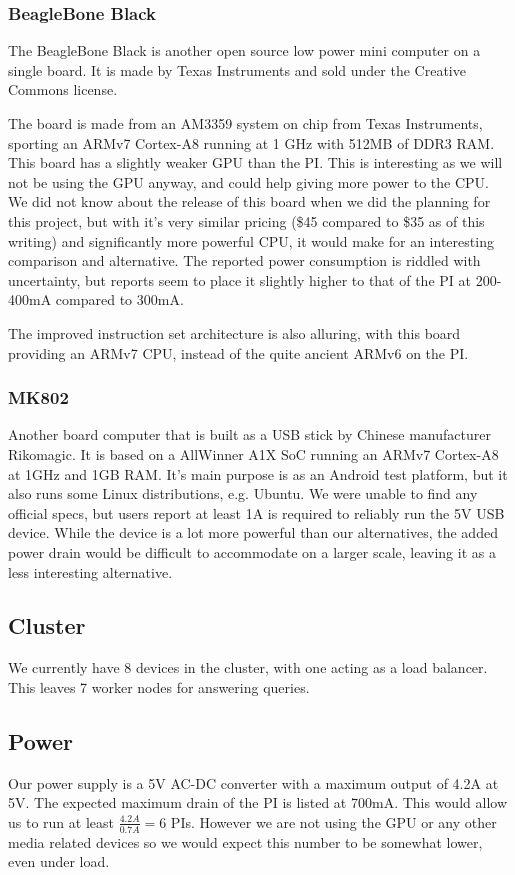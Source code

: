 \subsubsection{BeagleBone Black}
The BeagleBone Black is another open source low power mini computer on a single board. It is made by Texas Instruments and sold under the Creative Commons license.

The board is made from an AM3359 system on chip from Texas Instruments, sporting an ARMv7 Cortex-A8 running at 1 GHz with 512MB of DDR3 RAM. This board has a slightly weaker GPU than the PI. This is interesting as we will not be using the GPU anyway, and could help giving more power to the CPU.
We did not know about the release of this board when we did the planning for this project, but with it's very similar pricing (\$45 compared to \$35 as of this writing) and significantly more powerful CPU, it would make for an interesting comparison and alternative. The reported power consumption is riddled with uncertainty, but reports seem to place it slightly higher to that of the PI at 200-400mA compared to 300mA.

The improved instruction set architecture is also alluring, with this board providing an ARMv7 CPU, instead of the quite ancient ARMv6 on the PI.

\subsubsection{MK802}
Another board computer that is built as a USB stick by Chinese manufacturer Rikomagic.
It is based on a AllWinner A1X SoC running an ARMv7 Cortex-A8 at 1GHz and 1GB RAM. It's main purpose is as an Android test platform, but it also runs some Linux distributions, e.g. Ubuntu.
We were unable to find any official specs, but users report at least 1A is required to reliably run the 5V USB device. 
While the device is a lot more powerful than our alternatives, the added power drain would be difficult to accommodate on a larger scale, leaving it as a less interesting alternative.

\subsection{Cluster}
We currently have 8 devices in the cluster, with one acting as a load balancer. This leaves 7 worker nodes for answering queries.

\subsection{Power}
Our power supply is a 5V AC-DC converter with a maximum output of 4.2A at 5V. The expected maximum drain of the PI is listed at 700mA\cite{raspi_power_drain}. This would allow us to run at least $\frac{4.2A}{0.7A}=6$ PIs.
However we are not using the GPU or any other media related devices so we would expect this number to be somewhat lower, even under load.
